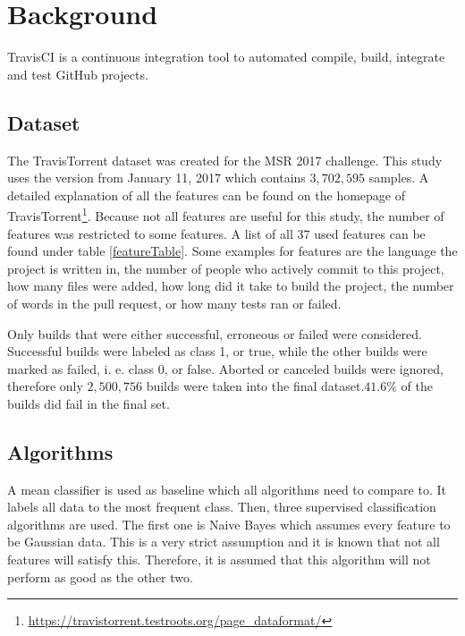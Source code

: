 \documentclass[a4paper,11pt]{article}
\begin{document}
\section{Background}

TravisCI is a continuous integration tool to automated compile, build, integrate and test GitHub projects. 

\subsection{Dataset}

The TravisTorrent\cite{msr17challenge} dataset was created for the MSR 2017 challenge. This study uses the version from January 11, 2017 which contains $3,702,595$ samples. A detailed explanation of all the features can be found on the homepage of TravisTorrent\footnote{\url{https://travistorrent.testroots.org/page_dataformat/}}. Because not all features are useful for this study, the number of features was restricted to some features. A list of all $37$ used features can be found under table \ref{featureTable}. 
Some examples for features are the language the project is written in, the number of people who actively commit to this project, how many files were added, how long did it take to build the project, the number of words in the pull request, or how many tests ran or failed.

Only builds that were either successful, erroneous or failed were considered. Successful builds were labeled as class 1, or true, while the other builds were marked as failed, i. e. class 0, or false. Aborted or canceled builds were ignored, therefore only $2,500,756$ builds were taken into the final dataset.$41.6\%$ of the builds did fail in the final set.  


\subsection{Algorithms}

A mean classifier is used as baseline which all algorithms need to compare to. It labels all data to the most frequent class.
Then, three supervised classification algorithms are used. 
The first one is Naive Bayes which assumes every feature to be Gaussian data. This is a very strict assumption and it is known that not all features will satisfy this. Therefore, it is assumed that this algorithm will not perform as good as the other two. 
\end{document}

